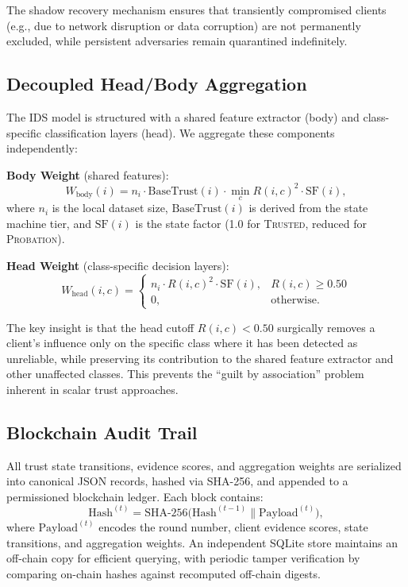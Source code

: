 \documentclass[conference]{IEEEtran}
\begin{document}
The shadow recovery mechanism ensures that transiently compromised clients (e.g., due to network disruption or data corruption) are not permanently excluded, while persistent adversaries remain quarantined indefinitely.

\subsection{Decoupled Head/Body Aggregation}
The IDS model is structured with a shared feature extractor (body) and class-specific classification layers (head). We aggregate these components independently:

\textbf{Body Weight} (shared features):
\begin{equation}
W_{\text{body}}(i) = n_i \cdot \text{BaseTrust}(i) \cdot \min_{c} R(i, c)^2 \cdot \text{SF}(i),
\label{eq:weight_body}
\end{equation}
where $n_i$ is the local dataset size, $\text{BaseTrust}(i)$ is derived from the state machine tier, and $\text{SF}(i)$ is the state factor (1.0 for \textsc{Trusted}, reduced for \textsc{Probation}).

\textbf{Head Weight} (class-specific decision layers):
\begin{equation}
W_{\text{head}}(i, c) =
\begin{cases}
n_i \cdot R(i, c)^2 \cdot \text{SF}(i), & R(i, c) \ge 0.50 \\
0, & \text{otherwise.}
\end{cases}
\label{eq:weight_head}
\end{equation}

The key insight is that the head cutoff $R(i, c) < 0.50$ surgically removes a client's influence only on the specific class where it has been detected as unreliable, while preserving its contribution to the shared feature extractor and other unaffected classes. This prevents the ``guilt by association'' problem inherent in scalar trust approaches.

\subsection{Blockchain Audit Trail}
All trust state transitions, evidence scores, and aggregation weights are serialized into canonical JSON records, hashed via SHA-256, and appended to a permissioned blockchain ledger. Each block contains:
\begin{equation}
\text{Hash}^{(t)} = \text{SHA-256}\Big(\text{Hash}^{(t-1)} \| \text{Payload}^{(t)}\Big),
\label{eq:hash}
\end{equation}
where $\text{Payload}^{(t)}$ encodes the round number, client evidence scores, state transitions, and aggregation weights. An independent SQLite store maintains an off-chain copy for efficient querying, with periodic tamper verification by comparing on-chain hashes against recomputed off-chain digests.
\end{document}

